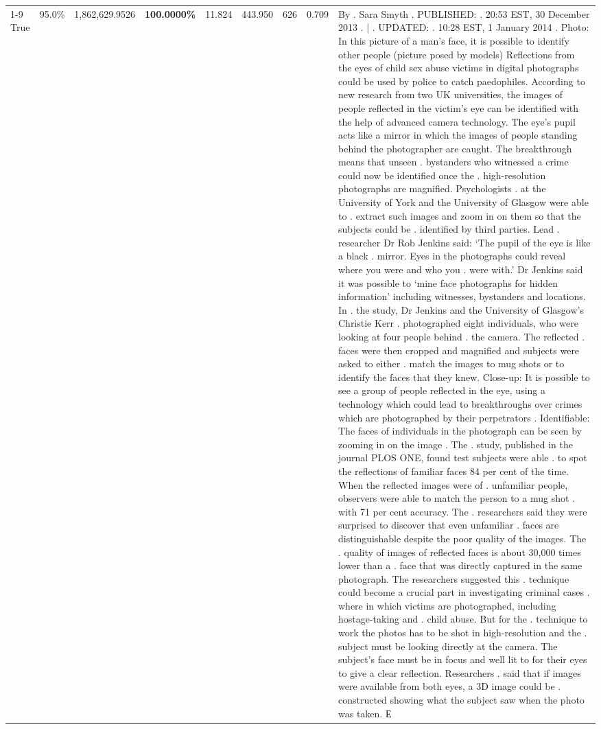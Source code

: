 \begin{table}[H]
\begin{tabular}{lllrlllll}
\cline{1-9}
True & 95.0\% & 1,862,629.9526 & \bfseries \color{red} 100.0000\% & 11.824 & 443.950 & 626 & 0.709 & By . Sara Smyth . PUBLISHED: . 20:53 EST, 30 December 2013 . | . UPDATED: . 10:28 EST, 1 January 2014 . Photo: In this picture of a man's face, it is possible to identify other people (picture posed by models) Reflections from the eyes of child sex abuse victims in digital photographs could be used by police to catch paedophiles. According to new research from two UK universities, the images of people reflected in the victim's eye can be identified with the help of advanced camera technology. The eye's pupil acts like a mirror in which the images of people standing behind the photographer are caught. The breakthrough means that unseen . bystanders who witnessed a crime could now be identified once the . high-resolution photographs are magnified. Psychologists . at the University of York and the University of Glasgow were able to . extract such images and zoom in on them so that the subjects could be . identified by third parties. Lead . researcher Dr Rob Jenkins said: ‘The pupil of the eye is like a black . mirror. Eyes in the photographs could reveal where you were and who you . were with.' Dr Jenkins said it was possible to ‘mine face photographs for hidden information' including witnesses, bystanders and locations. In . the study, Dr Jenkins and the University of Glasgow's Christie Kerr . photographed eight individuals, who were looking at four people behind . the camera. The reflected . faces were then cropped and magnified and subjects were asked to either . match the images to mug shots or to identify the faces that they knew. Close-up: It is possible to see a group of people reflected in the eye, using a technology which could lead to breakthroughs over crimes which are photographed by their perpetrators . Identifiable: The faces of individuals in the photograph can be seen by zooming in on the image . The . study, published in the journal PLOS ONE, found test subjects were able . to spot the reflections of familiar faces 84 per cent of the time. When the reflected images were of . unfamiliar people, observers were able to match the person to a mug shot . with 71 per cent accuracy. The . researchers said they were surprised to discover that even unfamiliar . faces are distinguishable despite the poor quality of the images. The . quality of images of reflected faces is about 30,000 times lower than a . face that was directly captured in the same photograph. The researchers suggested this . technique could become a crucial part in investigating criminal cases . where in which victims are photographed, including hostage-taking and . child abuse. But for the . technique to work the photos has to be shot in high-resolution and the . subject must be looking directly at the camera. The subject's face must be in focus and well lit to for their eyes to give a clear reflection. Researchers . said that if images were available from both eyes, a 3D image could be . constructed showing what the subject saw when the photo was taken. Е \\

\end{tabular}
\end{table}
